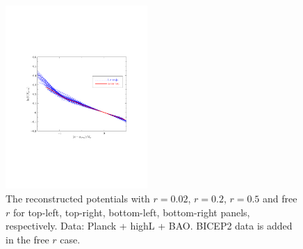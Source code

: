 \documentclass[11pt]{article}
\def \halffigwidth{0.48\textwidth}
\begin{document}
\begin{figure}
  \includegraphics[width=\halffigwidth,  trim = 1in 2.9in 1in 2.9in]{spline0_p11_potential_traj.pdf}
  \caption{The reconstructed potentials with $r = 0.02$, $r=0.2$, $r=0.5$ and free $r$ for top-left, top-right, bottom-left, bottom-right panels, respectively.  Data: Planck + highL + BAO. BICEP2 data is added in the free $r$ case. \label{fig:traj_potential}}
\end{figure}
\end{document}
